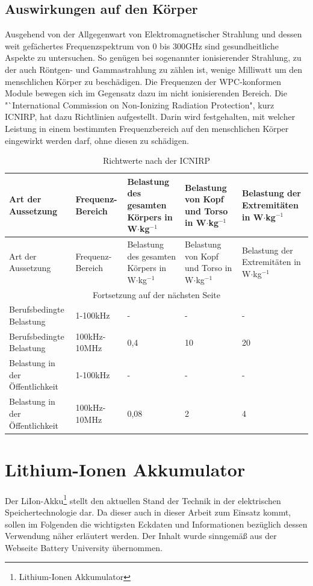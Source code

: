 \documentclass[12pt]{scrreprt} %
\begin{document}
\subsection{Auswirkungen auf den Körper}
Ausgehend von der Allgegenwart von Elektromagnetischer Strahlung und dessen weit gefächertes Frequenzspektrum von 0 bis 300GHz sind gesundheitliche Aspekte zu untersuchen. So genügen bei sogenannter ionisierender Strahlung, zu der auch Röntgen- und Gammastrahlung zu zählen ist, wenige Milliwatt um den menschlichen Körper zu beschädigen. Die Frequenzen der WPC-konformen Module bewegen sich im Gegensatz dazu im nicht ionisierenden Bereich. Die "`International Commission on Non-Ionizing Radiation Protection", kurz ICNIRP, hat dazu Richtlinien aufgestellt. Darin wird festgehalten, mit welcher Leistung in einem bestimmten Frequenzbereich auf den menschlichen Körper eingewirkt werden darf, ohne diesen zu schädigen.
\setlongtables
\begin{longtable}{| p{} |p{} | p{} |p{} |p{} |}
\caption{Richtwerte nach der ICNIRP}\\
\hline
Art der Aussetzung &Frequenz-Bereich&Belastung des gesamten Körpers in W$\cdot$kg$^{-1}$ &Belastung von Kopf und Torso in W$\cdot$kg$^{-1}$ & Belastung der Extremitäten in W$\cdot$kg$^{-1}$ \\
\hline
\endfirsthead
\hline
Art der Aussetzung &Frequenz-Bereich&Belastung des gesamten Körpers in W$\cdot$kg$^{-1}$ &Belastung von Kopf und Torso in W$\cdot$kg$^{-1}$ & Belastung der Extremitäten in W$\cdot$kg$^{-1}$ \\
\hline
\endhead
\hline
\multicolumn{5}{|c|}{Fortsetzung auf der nächsten Seite}\\
\hline
\endfoot
\hline \hline
\endlastfoot
\hline
\label{strahlung}%
Berufsbedingte Belastung&1-100kHz&-&-&-\\
Berufsbedingte Belastung&100kHz-10MHz&0,4&10&20\\
Belastung in der Öffentlichkeit&1-100kHz&-&-&-\\
Belastung in der Öffentlichkeit&100kHz-10MHz&0,08&2&4
\end{longtable}


\section{Lithium-Ionen Akkumulator}
Der LiIon-Akku\footnote{Lithium-Ionen Akkumulator} stellt den aktuellen Stand der Technik in der elektrischen Speichertechnologie dar. Da dieser auch in dieser Arbeit zum Einsatz kommt, sollen im Folgenden die wichtigsten Eckdaten und Informationen bezüglich dessen Verwendung näher erläutert werden. Der Inhalt wurde sinngemäß aus der Webseite Battery University \citep{BAT} übernommen.
\end{document}
